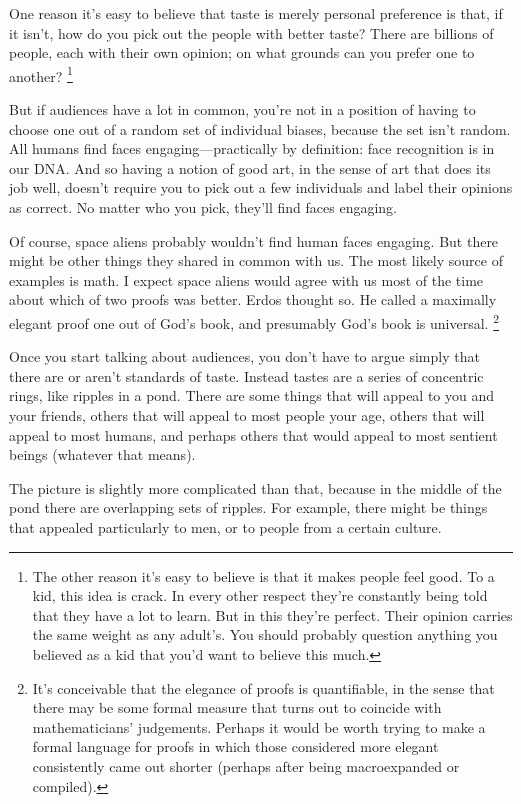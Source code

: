 \documentclass[12pt]{book}
\begin{document}
One reason it's easy to believe that taste is merely personal preference
is that, if it isn't, how do you pick out the people with better taste?
There are billions of people, each with their own opinion; on what
grounds can you prefer one to another? \footnote{The other reason it's easy to believe is that it makes people
feel good. To a kid, this idea is crack. In every other respect they're
constantly being told that they have a lot to learn. But in this they're
perfect. Their opinion carries the same weight as any adult's. You
should probably question anything you believed as a kid that you'd want
to believe this much.}

But if audiences have a lot in common, you're not in a position of
having to choose one out of a random set of individual biases, because
the set isn't random. All humans find faces engaging---practically by
definition: face recognition is in our DNA. And so having a notion of
good art, in the sense of art that does its job well, doesn't require
you to pick out a few individuals and label their opinions as correct.
No matter who you pick, they'll find faces engaging.

Of course, space aliens probably wouldn't find human faces engaging. But
there might be other things they shared in common with us. The most
likely source of examples is math. I expect space aliens would agree
with us most of the time about which of two proofs was better. Erdos
thought so. He called a maximally elegant proof one out of God's book,
and presumably God's book is universal. \footnote{It's conceivable that the elegance of proofs is quantifiable, in
the sense that there may be some formal measure that turns out to
coincide with mathematicians' judgements. Perhaps it would be worth
trying to make a formal language for proofs in which those considered
more elegant consistently came out shorter (perhaps after being
macroexpanded or compiled).}

Once you start talking about audiences, you don't have to argue simply
that there are or aren't standards of taste. Instead tastes are a series
of concentric rings, like ripples in a pond. There are some things that
will appeal to you and your friends, others that will appeal to most
people your age, others that will appeal to most humans, and perhaps
others that would appeal to most sentient beings (whatever that means).

The picture is slightly more complicated than that, because in the
middle of the pond there are overlapping sets of ripples. For example,
there might be things that appealed particularly to men, or to people
from a certain culture.
\end{document}
